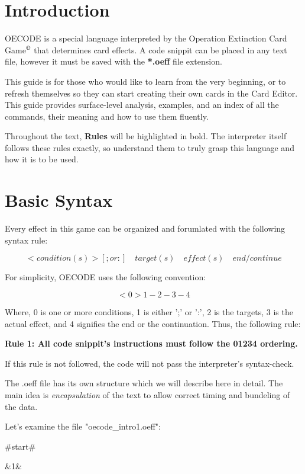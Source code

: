 \documentclass[12pt,letterpaper]{article}
\begin{document}
\section*{Introduction \hfill}

\quad OECODE is a special language interpreted by the Operation Extinction Card Game$^{\copyright}$ that determines card effects. A code snippit can be placed in any text file, however it must be saved with the \textbf{*.oeff} file extension.

\quad This guide is for those who would like to learn from the very beginning, or to refresh themselves so they can start creating their own cards in the Card Editor. This guide provides surface-level analysis, examples, and an index of all the commands, their meaning and how to use them fluently.

\quad Throughout the text, \textbf{Rules} will be highlighted in bold. The interpreter itself follows these rules exactly, so understand them to truly grasp this language and how it is to be used.

\section{Basic Syntax}

\quad Every effect in this game can be organized and forumlated with the following syntax rule:

$$<condition(s)> [; or :] \quad target(s) \quad effect(s) \quad end/continue $$

For simplicity, OECODE uses the following convention:

$$ <0> 1-2-3-4$$

Where, 0 is one or more conditions, 1 is either ';' or ':', 2 is the targets, 3 is the actual effect, and 4 signifies the end or the continuation. Thus, the following rule:

\textbf{Rule 1: All code snippit's instructions must follow the 01234 ordering.}

If this rule is not followed, the code will not pass the interpreter's syntax-check.

\quad The .oeff file has its own structure which we will describe here in detail. The main idea is \textit{encapsulation} of the text to allow correct timing and bundeling of the data.

Let's examine the file "oecode\_intro1.oeff":

\#start\#

\&1\&
\end{document}
